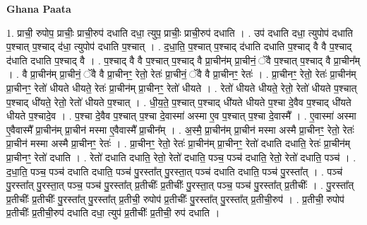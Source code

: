 \documentclass[17pt]{extarticle}
\begin{document}
\textbf{Ghana Paata } \newline

1. प्राची॒ रुपोप॒ प्राचीः॒ प्राची॒रुप॑ दधाति दधा॒ त्युप॒ प्राचीः॒ प्राची॒रुप॑ दधाति । . उप॑ दधाति दधा॒ त्युपोप॑ दधाति प॒श्चात् प॒श्चाद् द॑धा॒ त्युपोप॑ दधाति प॒श्चात् । . द॒धा॒ति॒ प॒श्चात् प॒श्चाद् द॑धाति दधाति प॒श्चाद् वै वै प॒श्चाद् द॑धाति दधाति प॒श्चाद् वै । . प॒श्चाद् वै वै प॒श्चात् प॒श्चाद् वै प्रा॒चीन॑म् प्रा॒चीनं॒ ॅवै प॒श्चात् प॒श्चाद् वै प्रा॒चीन᳚म् । . वै प्रा॒चीन॑म् प्रा॒चीनं॒ ॅवै वै प्रा॒चीनꣳ॒॒ रेतो॒ रेतः॑ प्रा॒चीनं॒ ॅवै वै प्रा॒चीनꣳ॒॒ रेतः॑ । . प्रा॒चीनꣳ॒॒ रेतो॒ रेतः॑ प्रा॒चीन॑म् प्रा॒चीनꣳ॒॒ रेतो॑ धीयते धीयते॒ रेतः॑ प्रा॒चीन॑म् प्रा॒चीनꣳ॒॒ रेतो॑ धीयते । . रेतो॑ धीयते धीयते॒ रेतो॒ रेतो॑ धीयते प॒श्चात् प॒श्चाद् धी॑यते॒ रेतो॒ रेतो॑ धीयते प॒श्चात् । . धी॒य॒ते॒ प॒श्चात् प॒श्चाद् धी॑यते धीयते प॒श्चा दे॒वैव प॒श्चाद् धी॑यते धीयते प॒श्चादे॒व । . प॒श्चा दे॒वैव प॒श्चात् प॒श्चा दे॒वास्मा॑ अस्मा ए॒व प॒श्चात् प॒श्चा दे॒वास्मै᳚ । . ए॒वास्मा॑ अस्मा ए॒वैवास्मै᳚ प्रा॒चीन॑म् प्रा॒चीन॑ मस्मा ए॒वैवास्मै᳚ प्रा॒चीन᳚म् । . अ॒स्मै॒ प्रा॒चीन॑म् प्रा॒चीन॑ मस्मा अस्मै प्रा॒चीनꣳ॒॒ रेतो॒ रेतः॑ प्रा॒चीन॑ मस्मा अस्मै प्रा॒चीनꣳ॒॒ रेतः॑ । . प्रा॒चीनꣳ॒॒ रेतो॒ रेतः॑ प्रा॒चीन॑म् प्रा॒चीनꣳ॒॒ रेतो॑ दधाति दधाति॒ रेतः॑ प्रा॒चीन॑म् प्रा॒चीनꣳ॒॒ रेतो॑ दधाति । . रेतो॑ दधाति दधाति॒ रेतो॒ रेतो॑ दधाति॒ पञ्च॒ पञ्च॑ दधाति॒ रेतो॒ रेतो॑ दधाति॒ पञ्च॑ । . द॒धा॒ति॒ पञ्च॒ पञ्च॑ दधाति दधाति॒ पञ्च॑ पु॒रस्ता᳚त् पु॒रस्ता॒त् पञ्च॑ दधाति दधाति॒ पञ्च॑ पु॒रस्ता᳚त् । . पञ्च॑ पु॒रस्ता᳚त् पु॒रस्ता॒त् पञ्च॒ पञ्च॑ पु॒रस्ता᳚त् प्र॒तीचीः᳚ प्र॒तीचीः᳚ पु॒रस्ता॒त् पञ्च॒ पञ्च॑ पु॒रस्ता᳚त् प्र॒तीचीः᳚ । . पु॒रस्ता᳚त् प्र॒तीचीः᳚ प्र॒तीचीः᳚ पु॒रस्ता᳚त् पु॒रस्ता᳚त् प्र॒तीची॒ रुपोप॑ प्र॒तीचीः᳚ पु॒रस्ता᳚त् पु॒रस्ता᳚त् प्र॒तीची॒रुप॑ । . प्र॒तीची॒ रुपोप॑ प्र॒तीचीः᳚ प्र॒तीची॒रुप॑ दधाति दधा॒ त्युप॑ प्र॒तीचीः᳚ प्र॒तीची॒ रुप॑ दधाति । \newline
\end{document}
